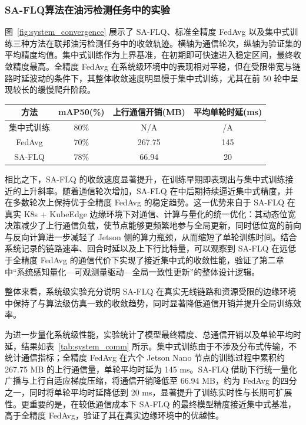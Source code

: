 \subsubsection{SA-FLQ算法在油污检测任务中的实验}
图~\ref{fig:system_convergence} 展示了 SA\mbox{-}FLQ、标准全精度 FedAvg 以及集中式训练三种方法在联邦油污检测任务中的收敛轨迹。横轴为通信轮次，纵轴为验证集的平均精度均值。集中式训练作为上界基准，在初期即可快速进入稳定区间，最终收敛精度最高。全精度 FedAvg 在系统级环境中的表现相对平稳，但在受限带宽与链路时延波动的条件下，其整体收敛速度明显慢于集中式训练，尤其在前 50 轮中呈现较长的缓慢爬升阶段。

\begin{table}[!hbtp]
	\centering
	\begin{tabular}{c|c|c|c}
		\hline
		方法 & mAP50(\%) & 上行通信开销(MB) & 平均单轮时延(ms) \\
		\hline
		集中式训练 & $80\%$     & N/A           & 
		/A \\
		FedAvg & $70\%$     & 267.75 & 145 \\
		SA\mbox{-}FLQ       & $78\%$  & 66.94 & 20 \\
		\hline
	\end{tabular}
\end{table}\label{tab:system_comm}

相比之下，SA\mbox{-}FLQ 的收敛速度显著提升，在训练早期即表现出与集中式训练接近的上升斜率。随着通信轮次增加，SA\mbox{-}FLQ 在中后期持续逼近集中式精度，并在多数轮次上保持优于全精度 FedAvg 的稳定趋势。这一优势来自于 SA\mbox{-}FLQ 在真实 K8s + KubeEdge 边缘环境下对通信、计算与量化的统一优化：其动态位宽决策减少了上行通信负载，使节点能够更频繁地参与全局更新，同时低位宽的前向与反向计算进一步减轻了 Jetson 侧的算力瓶颈，从而缩短了单轮训练时间。结合系统记录的链路速率、回合时延以及上下行比特量，可以观察到 SA\mbox{-}FLQ 在远低于全精度 FedAvg 的通信代价下实现了接近集中式的收敛性能，验证了第二章中“系统感知量化—可观测量驱动—全局一致性更新”的整体设计逻辑。

整体来看，系统级实验充分说明 SA\mbox{-}FLQ 在真实无线链路和资源受限的边缘环境中保持了与算法级仿真一致的收敛趋势，同时显著降低通信开销并提升全局训练效率。

为进一步量化系统级性能，实验统计了模型最终精度、总通信开销以及单轮平均时延，结果如表~\ref{tab:system_comm} 所示。集中式训练由于不涉及分布式传输，不统计通信指标；全精度 FedAvg 在六个 Jetson Nano 节点的训练过程中累积约 267.75 MB 的上行通信量，单轮平均时延为 145 ms。SA\mbox{-}FLQ 借助下行统一量化广播与上行自适应梯度压缩，将通信开销降低至 66.94 MB，约为 FedAvg 的四分之一，同时将单轮平均时延降低到 20 ms，显著提升了训练实时性与长期可扩展性。更重要的是，在较低通信成本下 SA\mbox{-}FLQ 的最终模型精度接近集中式基准，高于全精度 FedAvg，验证了其在真实边缘环境中的优越性。

